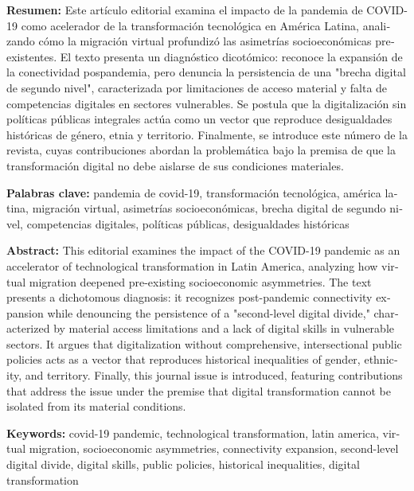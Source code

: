 \documentclass{article}
\begin{document}
\begin{tcolorbox}[colback=brown!8!white,colframe=brown!8!white,boxrule=0pt,arc=2pt,left=4pt,right=4pt,top=3pt,bottom=3pt,before skip=4pt,after skip=4pt]
\begin{otherlanguage}{spanish}
\sffamily\small \textbf{Resumen:} Este artículo editorial examina el impacto de la pandemia de COVID-19 como acelerador de la transformación tecnológica en América Latina, analizando cómo la migración virtual profundizó las asimetrías socioeconómicas preexistentes. El texto presenta un diagnóstico dicotómico: reconoce la expansión de la conectividad pospandemia, pero denuncia la persistencia de una "brecha digital de segundo nivel", caracterizada por limitaciones de acceso material y falta de competencias digitales en sectores vulnerables. Se postula que la digitalización sin políticas públicas integrales actúa como un vector que reproduce desigualdades históricas de género, etnia y territorio. Finalmente, se introduce este número de la revista, cuyas contribuciones abordan la problemática bajo la premisa de que la transformación digital no debe aislarse de sus condiciones materiales.
\par\smallskip\noindent\textbf{Palabras clave:} pandemia de covid-19, transformación tecnológica, américa latina, migración virtual, asimetrías socioeconómicas, brecha digital de segundo nivel, competencias digitales, políticas públicas, desigualdades históricas
\end{otherlanguage}
\end{tcolorbox}

\begin{tcolorbox}[colback=brown!8!white,colframe=brown!8!white,boxrule=0pt,arc=2pt,left=4pt,right=4pt,top=3pt,bottom=3pt,before skip=4pt,after skip=4pt]
\begin{otherlanguage}{english}
\sffamily\small \textbf{Abstract:} This editorial examines the impact of the COVID-19 pandemic as an accelerator of technological transformation in Latin America, analyzing how virtual migration deepened pre-existing socioeconomic asymmetries. The text presents a dichotomous diagnosis: it recognizes post-pandemic connectivity expansion while denouncing the persistence of a "second-level digital divide," characterized by material access limitations and a lack of digital skills in vulnerable sectors. It argues that digitalization without comprehensive, intersectional public policies acts as a vector that reproduces historical inequalities of gender, ethnicity, and territory. Finally, this journal issue is introduced, featuring contributions that address the issue under the premise that digital transformation cannot be isolated from its material conditions.
\par\smallskip\noindent\textbf{Keywords:} covid-19 pandemic, technological transformation, latin america, virtual migration, socioeconomic asymmetries, connectivity expansion, second-level digital divide, digital skills, public policies, historical inequalities, digital transformation
\end{otherlanguage}
\end{tcolorbox}
\end{document}
